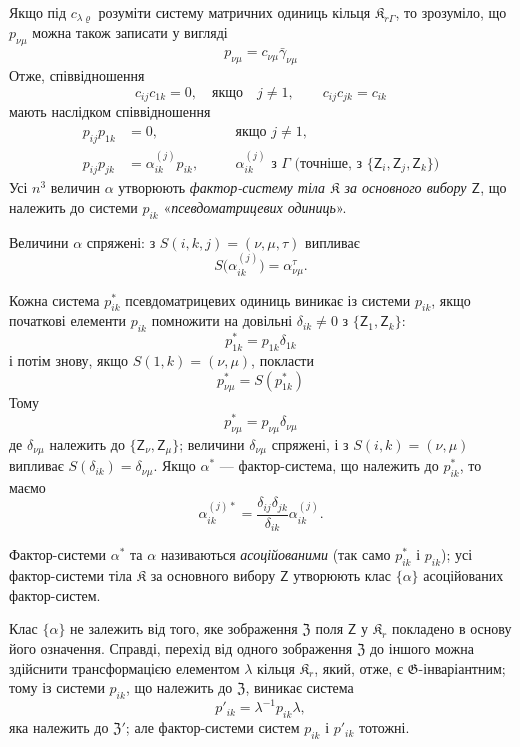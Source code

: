 \documentclass[11pt]{article}
\begin{document}
Якщо під \(c_{\lambda\varrho}\) розуміти систему матричних одиниць кільця \(\mathfrak K_{r\Gamma}\), то зрозуміло, що \(p_{\nu\mu}\) можна також записати у вигляді
\[
p_{\nu\mu}=c_{\nu\mu}\bar\gamma_{\nu\mu}
\]
Отже, співвідношення
\[
c_{ij}c_{1k}=0,\quad\text{якщо}\quad j\ne1,
\qquad
c_{ij}c_{jk}=c_{ik}
\]
мають наслідком співвідношення
\[
\begin{aligned}
p_{ij}p_{1k}&=0,\quad &&\text{якщо }j\ne1,\\
p_{ij}p_{jk}&=\alpha_{ik}^{(j)}p_{ik},\quad
&&\alpha_{ik}^{(j)}\text{ з }\Gamma\text{ (точніше, з }\{\mathsf{Z}_i,\mathsf{Z}_j,\mathsf{Z}_k\}\text{)}
\end{aligned}
\]
Усі \(n^3\) величин \(\alpha\) утворюють \emph{фактор-систему тіла \(\mathfrak K\) за основного вибору \(\mathsf{Z}\)}, що належить до системи \(p_{ik}\) «\emph{псевдоматрицевих одиниць}».

Величини \(\alpha\) спряжені: з \(S(i,k,j)=(\nu,\mu,\tau)\) випливає
\[
S\bigl(\alpha_{ik}^{(j)}\bigr)=\alpha_{\nu\mu}^{\tau}.
\]

Кожна система \(p_{ik}^*\) псевдоматрицевих одиниць виникає із системи \(p_{ik}\), якщо початкові елементи \(p_{ik}\) помножити на довільні \(\delta_{ik}\ne0\) з \(\{\mathsf{Z}_1,\mathsf{Z}_k\}\):
\[
p_{1k}^*=p_{1k}\delta_{1k}
\]
і потім знову, якщо \(S(1,k)=(\nu,\mu)\), покласти
\[
p_{\nu\mu}^*=S(p_{1k}^*)
\]
Тому
\[
p_{\nu\mu}^*=p_{\nu\mu}\delta_{\nu\mu}
\]
де \(\delta_{\nu\mu}\) належить до \(\{\mathsf{Z}_\nu,\mathsf{Z}_\mu\}\); величини \(\delta_{\nu\mu}\) спряжені, і з \(S(i,k)=(\nu,\mu)\) випливає \(S(\delta_{ik})=\delta_{\nu\mu}\). Якщо \(\alpha^*\) --- фактор-система, що належить до \(p_{ik}^*\), то маємо
\[
\alpha_{ik}^{(j)*}=\frac{\delta_{ij}\delta_{jk}}{\delta_{ik}}\alpha_{ik}^{(j)}.
\]

Фактор-системи \(\alpha^*\) та \(\alpha\) називаються \emph{асоційованими} (так само \(p_{ik}^*\) і \(p_{ik}\)); усі фактор-системи тіла \(\mathfrak K\) за основного вибору \(\mathsf{Z}\) утворюють клас \(\{\alpha\}\) асоційованих фактор-систем.

Клас \(\{\alpha\}\) не залежить від того, яке зображення \(\mathfrak Z\) поля \(\mathsf{Z}\) у \(\mathfrak K_r\) покладено в основу його означення. Справді, перехід від одного зображення \(\mathfrak Z\) до іншого можна здійснити трансформацією елементом \(\lambda\) кільця \(\mathfrak K_r\), який, отже, є \(\mathfrak G\)-інваріантним; тому із системи \(p_{ik}\), що належить до \(\mathfrak Z\), виникає система
\[
p'_{ik}=\lambda^{-1}p_{ik}\lambda,
\]
яка належить до \(\mathfrak Z'\); але фактор-системи систем \(p_{ik}\) і \(p'_{ik}\) тотожні.
\end{document}
